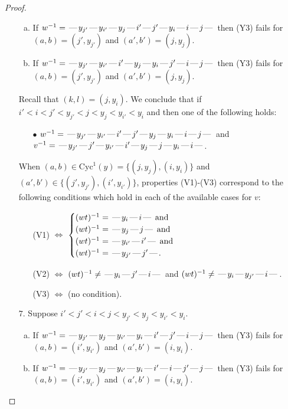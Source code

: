 \documentclass[10pt]{article}
\theoremstyle{definition}
\theoremstyle{definition}
\def\dash{\text{\hspace{0.5mm}---\hspace{0.5mm}}}
\def\Cyc{\mathrm{Cyc}}
\begin{document}
\begin{proof}
\begin{enumerate}
\begin{enumerate}[(a)]
\item If $w^{-1} = \dash y_{j'}\dash y_{i'}\dash y_j\dash i'\dash j'\dash y_i\dash i\dash j\dash $ then (Y3) fails for $(a,b)=(j',y_{j'})$ and $(a',b')=(j,y_j)$.
\item If $w^{-1} = \dash y_{j'}\dash y_{i'}\dash i'\dash y_j\dash y_i\dash j'\dash i\dash j\dash $ then (Y3) fails for $(a,b)=(j',y_{j'})$ and $(a',b')=(j,y_j)$.
\end{enumerate}
Recall that $(k,l) = (j,y_i)$.
We conclude that if $i' < i < j' < y_{j'} < j < y_j < y_{i'} < y_i$ and then one of the following holds:
\begin{enumerate}
\item[$\bullet$] $w^{-1} = \dash y_{j'}\dash y_{i'}\dash i'\dash j'\dash y_j\dash y_i\dash i\dash j\dash $ and $v^{-1} = \dash y_{j'}\dash j'\dash y_{i'}\dash i'\dash y_j\dash j\dash y_i\dash i\dash $.
\end{enumerate}
When $(a,b)\in\Cyc^1(y)=\{(j,y_j),(i,y_i)\}$ and $(a',b')\in\{(j',y_{j'}),(i',y_{i'})\}$,
properties (V1)-(V3) correspond to the following conditions which hold in
each of the available cases for $v$:
\begin{enumerate}
\item[](V1) $\Leftrightarrow$ $\begin{cases}\text{$(wt)^{-1} = \dash y_i \dash i \dash$}\text{ and }\\
\text{$(wt)^{-1} = \dash y_j \dash j \dash$}\text{ and }\\
\text{$(wt)^{-1} = \dash y_{i'} \dash i' \dash$}\text{ and }\\
\text{$(wt)^{-1} = \dash y_{j'} \dash j' \dash$}.\end{cases}$
\item[](V2) $\Leftrightarrow$ $(wt)^{-1} \neq \dash y_i \dash j' \dash i \dash$ and $(wt)^{-1}\neq \dash y_i \dash y_{j'} \dash i \dash$.
\item[](V3) $\Leftrightarrow$ (no condition).
\end{enumerate}
\item[$7$.] Suppose $i' < j' < i < j < y_{j'} < y_j < y_{i'} < y_i$.
\begin{enumerate}[(a)]
\item If $w^{-1} = \dash y_{j'}\dash y_j\dash y_{i'}\dash y_i\dash i'\dash j'\dash i\dash j\dash $ then (Y3) fails for $(a,b)=(i',y_{i'})$ and $(a',b')=(i,y_i)$.
\item If $w^{-1} = \dash y_{j'}\dash y_j\dash y_{i'}\dash y_i\dash i'\dash i\dash j'\dash j\dash $ then (Y3) fails for $(a,b)=(i',y_{i'})$ and $(a',b')=(i,y_i)$.

\end{enumerate}
\end{enumerate}
\end{proof}
\end{document}
